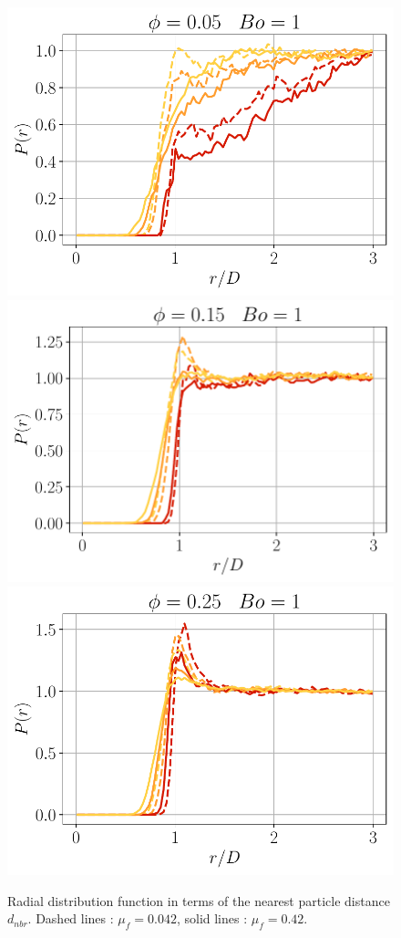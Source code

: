 \begin{figure}[h!]
    \includegraphics[height=0.15\textheight]{image/N_10/radial/probarBo1PHI0_05.pdf}
    \includegraphics[height=0.15\textheight]{image/N_10/radial/probarBo1PHI0_15.pdf}
    \includegraphics[height=0.15\textheight]{image/N_10/radial/probarBo1PHI0_25.pdf}
    \caption{Radial distribution function in terms of the nearest particle distance $d_{nbr}$. Dashed lines : $\mu_f = 0.042$, solid lines : $\mu_f = 0.42$.} 
    \label{fig:Pr}
\end{figure} 



